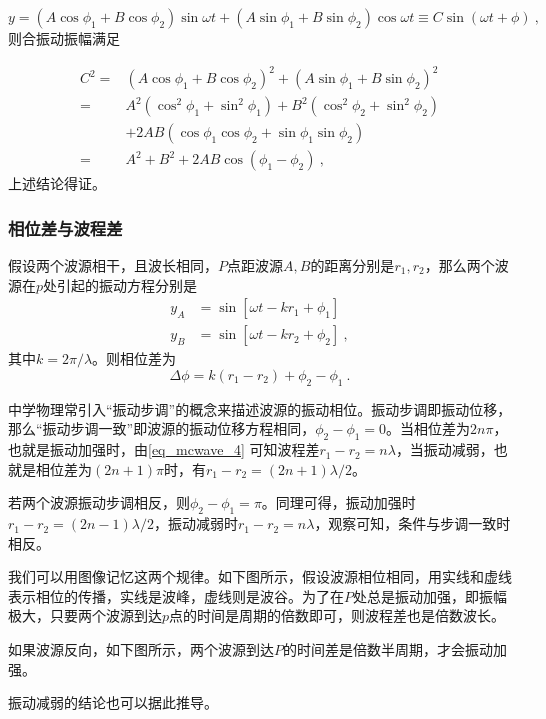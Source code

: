\begin{equation}
y=\left(A \cos \phi_1+B \cos \phi_2\right) \sin \omega t+\left(A \sin \phi_1+B \sin \phi_2\right) \cos \omega t\equiv C\sin (\omega t+\phi)~,
\end{equation}
则合振动振幅满足

\begin{equation}\label{eq_mcwave_3}
\begin{aligned}
C^2
= & \left(A \cos \phi_1+B \cos \phi_2\right)^2+\left(A \sin \phi_1+B \sin \phi_2\right)^2 \\
= & A^2\left(\cos ^2 \phi_1+\sin ^2 \phi_1\right)+B^2\left(\cos ^2 \phi_2+\sin ^2 \phi_2\right) \\
& +2 A B\left(\cos \phi_1 \cos \phi_2+\sin \phi_1 \sin \phi_2\right) \\
= & A^2+B^2+2 A B \cos \left(\phi_1-\phi_2\right)~,
\end{aligned}
\end{equation}
上述结论得证。
\subsubsection{相位差与波程差}
假设两个波源相干，且波长相同，$P$点距波源$A,B$的距离分别是$r_1,r_2$，那么两个波源在$p$处引起的振动方程分别是
\begin{equation}
\begin{aligned}
y_A&=\sin[\omega t-kr_1+\phi_1]\\
y_B&=\sin[\omega t-kr_2+\phi_2]~,
\end{aligned}
\end{equation}
其中$k=2\pi/\lambda$。则相位差为
\begin{equation}\label{eq_mcwave_4}
\Delta\phi=k(r_1-r_2)+\phi_2-\phi_1~.
\end{equation}

中学物理常引入“振动步调”的概念来描述波源的振动相位。振动步调即振动位移，那么“振动步调一致”即波源的振动位移方程相同，$\phi_2-\phi_1=0$。当相位差为$2n\pi$，也就是振动加强时，由\autoref{eq_mcwave_4} 可知波程差$r_1-r_2=n\lambda$，当振动减弱，也就是相位差为$(2n+1)\pi$时，有$r_1-r_2=(2n+1)\lambda/2$。


若两个波源振动步调相反，则$\phi_2-\phi_1=\pi$。同理可得，振动加强时$r_1-r_2=(2n-1)\lambda/2$，振动减弱时$r_1-r_2=n\lambda$，观察可知，条件与步调一致时相反。

我们可以用图像记忆这两个规律。如下图所示，假设波源相位相同，用实线和虚线表示相位的传播，实线是波峰，虚线则是波谷。为了在$P$处总是振动加强，即振幅极大，只要两个波源到达$p$点的时间是周期的倍数即可，则波程差也是倍数波长。


如果波源反向，如下图所示，两个波源到达$P$的时间差是倍数半周期，才会振动加强。

振动减弱的结论也可以据此推导。
